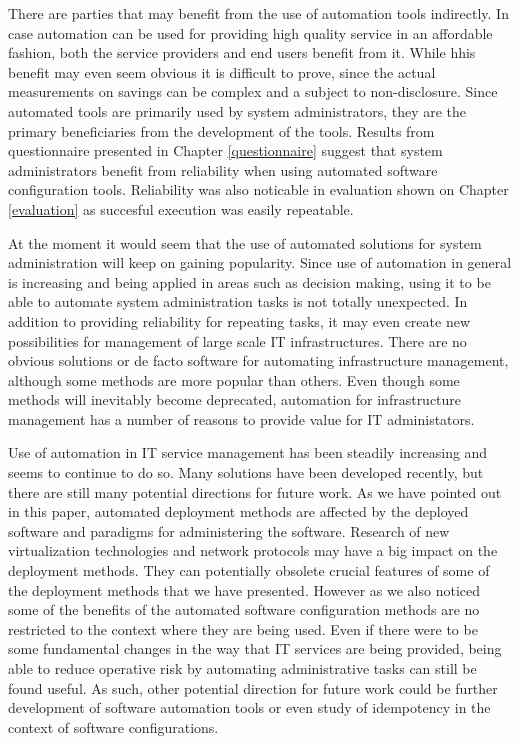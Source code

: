 There are parties that may benefit from the use of automation tools indirectly.
In case automation can be used for providing high quality service in an
affordable fashion, both the service providers and end users benefit from it.
While hhis benefit may even seem obvious it is difficult to prove, since the
actual measurements on savings can be complex and a subject to non-disclosure.
Since automated tools are primarily used by system administrators, they are the
primary beneficiaries from the development of the tools. Results from
questionnaire presented in Chapter \ref{questionnaire} suggest that system
administrators benefit from reliability when using automated software
configuration tools. Reliability was also noticable in evaluation shown on
Chapter \ref{evaluation} as succesful execution was easily repeatable.

At the moment it would seem that the use of automated solutions for system
administration will keep on gaining popularity. Since use of automation in
general is increasing and being applied in areas such as decision making, using
it to be able to automate system administration tasks is not totally
unexpected. In addition to providing reliability for repeating tasks, it may
even create new possibilities for management of large scale IT infrastructures.
There are no obvious solutions or de facto software for automating
infrastructure management, although some methods are more popular than others.
Even though some methods will inevitably become deprecated, automation for
infrastructure management has a number of reasons to provide value for IT
administators.

Use of automation in IT service management has been steadily increasing and
seems to continue to do so. Many solutions have been developed recently, but
there are still many potential directions for future work. As we have pointed
out in this paper, automated deployment methods are affected by the deployed
software and paradigms for administering the software. Research of new
virtualization technologies and network protocols may have a big impact on the
deployment methods. They can potentially obsolete crucial features of some of
the deployment methods that we have presented. However as we also noticed some
of the benefits of the automated software configuration methods are no
restricted to the context where they are being used. Even if there were to be
some fundamental changes in the way that IT services are being provided, being
able to reduce operative risk by automating administrative tasks can still be
found useful. As such, other potential direction for future work could be
further development of software automation tools or even study of idempotency
in the context of software configurations.
